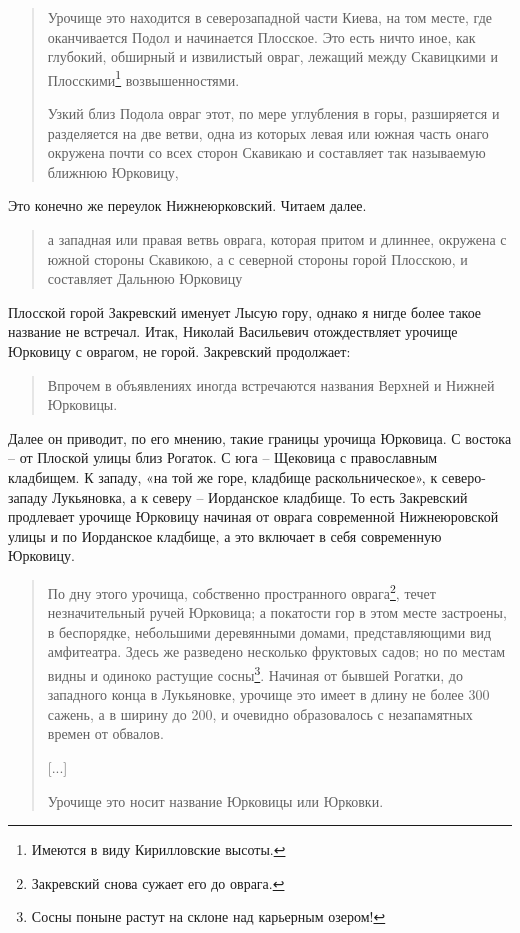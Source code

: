 \begin{quotation}
Урочище это находится в северозападной части Киева, на том месте, где оканчивается Подол и начинается Плосское. Это есть ничто иное, как глубокий, обширный и извилистый овраг, лежащий между Скавицкими и Плосскими\footnote{Имеются в виду Кирилловские высоты.} возвышенностями. 

Узкий близ Подола овраг этот, по мере углубления в горы, разширяется и разделяется на две ветви, одна из которых левая или южная часть онаго окружена почти со всех сторон Скавикаю и составляет так называемую ближнюю Юрковицу, 
\end{quotation}

Это конечно же переулок Нижнеюрковский. Читаем далее.

\begin{quotation}
а западная или правая ветвь оврага, которая притом и длиннее, окружена с южной стороны Скавикою, а с северной стороны горой Плосскою, и составляет Дальнюю Юрковицу
\end{quotation}

Плосской горой Закревский именует Лысую гору, однако я нигде более такое название не встречал. Итак, Николай Васильевич отождествляет урочище Юрковицу с оврагом, не горой. Закревский продолжает:

\begin{quotation}
Впрочем в объявлениях иногда встречаются названия Верхней и Нижней Юрковицы. 
\end{quotation}

Далее он приводит, по его мнению, такие границы урочища Юрковица. С востока – от Плоской улицы близ Рогаток. С юга – Щековица с православным кладбищем. К западу, «на той же горе, кладбище раскольническое», к северо-западу Лукьяновка, а к северу – Иорданское кладбище. То есть Закревский продлевает урочище Юрковицу начиная от оврага современной Нижнеюровской улицы и по Иорданское кладбище, а это включает в себя современную Юрковицу.

\begin{quotation}
По дну этого урочища, собственно пространного оврага\footnote{Закревский снова сужает его до оврага.}, течет незначительный ручей Юрковица; а покатости гор в этом месте застроены, в беспорядке, небольшими деревянными домами, представляющими вид амфитеатра. Здесь же разведено несколько фруктовых садов; но по местам видны и одиноко растущие сосны\footnote{Сосны поныне растут на склоне над карьерным озером!}. Начиная от бывшей Рогатки, до западного конца в Лукьяновке, урочище это имеет в длину не более 300 сажень, а в ширину до 200, и очевидно образовалось с незапамятных времен от обвалов.

[...]

Урочище это носит название Юрковицы или Юрковки.
\end{quotation}

